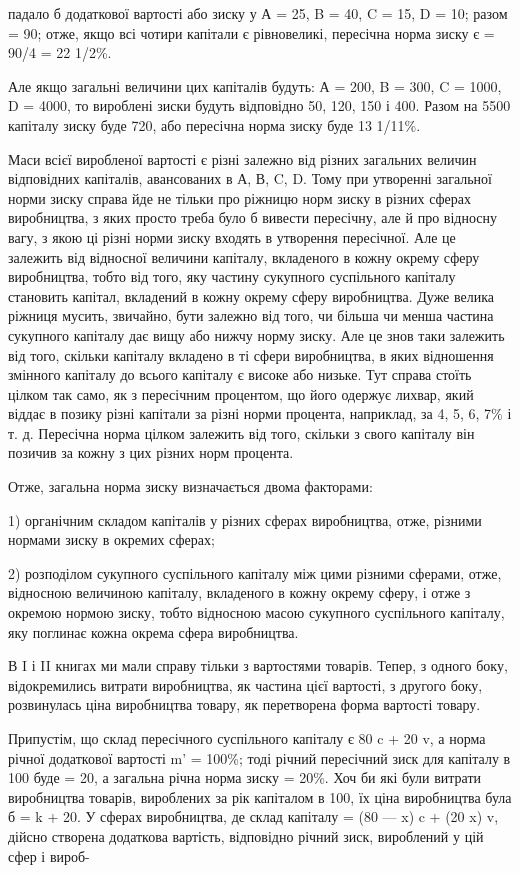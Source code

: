 падало б додаткової вартості або зиску у А = 25, B = 40, C = 15, D = 10; разом = 90; отже, якщо всі
чотири капітали є рівновеликі, пересічна норма зиску є = 90/4 = 22 1/2\%.

Але якщо загальні величини цих капіталів будуть: А = 200, B = 300, C = 1000, D = 4000, то вироблені
зиски будуть відповідно 50, 120, 150 і 400. Разом на 5500 капіталу зиску буде 720, або пересічна
норма зиску буде 13 1/11\%.

Маси всієї виробленої вартості є різні залежно від різних загальних величин відповідних капіталів,
авансованих в А, В, C, D.
Тому при утворенні загальної норми зиску справа йде не тільки
про ріжницю норм зиску в різних сферах виробництва, з яких
просто треба було б вивести пересічну, але й про відносну вагу,
з якою ці різні норми зиску входять в утворення пересічної.
Але це залежить від відносної величини капіталу, вкладеного
в кожну окрему сферу виробництва, тобто від того, яку частину
сукупного суспільного капіталу становить капітал, вкладений
в кожну окрему сферу виробництва. Дуже велика ріжниця мусить, звичайно, бути залежно від того, чи
більша чи менша
частина сукупного капіталу дає вищу або нижчу норму зиску.
Але це знов таки залежить від того, скільки капіталу вкладено
в ті сфери виробництва, в яких відношення змінного капіталу
до всього капіталу є високе або низьке. Тут справа стоїть цілком
так само, як з пересічним процентом, що його одержує лихвар,
який віддає в позику різні капітали за різні норми процента, наприклад, за 4, 5, 6, 7\% і т. д.
Пересічна норма цілком залежить
від того, скільки з свого капіталу він позичив за кожну з цих
різних норм процента.

Отже, загальна норма зиску визначається двома факторами:

1) органічним складом капіталів у різних сферах виробництва,
отже, різними нормами зиску в окремих сферах;

2) розподілом сукупного суспільного капіталу між цими різними сферами, отже, відносною величиною
капіталу, вкладеного
в кожну окрему сферу, і отже з окремою нормою зиску, тобто
відносною масою сукупного суспільного капіталу, яку поглинає
кожна окрема сфера виробництва.

В I і II книгах ми мали справу тільки з вартостями товарів.
Тепер, з одного боку, відокремились витрати виробництва, як
частина цієї вартості, з другого боку, розвинулась ціна виробництва товару, як перетворена форма
вартості товару.

Припустім, що склад пересічного суспільного капіталу є
80 c + 20 v, а норма річної додаткової вартості m' = 100\%; тоді
річний пересічний зиск для капіталу в 100 буде = 20, а загальна
річна норма зиску = 20\%. Хоч би які були витрати виробництва
товарів, вироблених за рік капіталом в 100, їх ціна виробництва була б = k + 20. У сферах
виробництва, де склад капіталу = (80 — x) c + (20 x) v, дійсно створена додаткова вартість,
відповідно річний зиск, вироблений у цій сфер і вироб-

